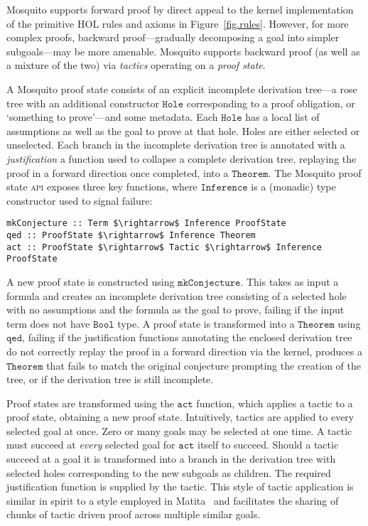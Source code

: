 \documentclass{llncs}
\newcommand{\mosquito}{Mosquito\xspace}
\begin{document}
\mosquito supports forward proof by direct appeal to the kernel implementation of the primitive HOL rules and axioms in Figure~\ref{fig.rules}.
However, for more complex proofs, backward proof---gradually decomposing a goal into simpler subgoals---may be more amenable.
\mosquito supports backward proof (as well as a mixture of the two) via \emph{tactics} operating on a \emph{proof state}.

A \mosquito proof state consists of an explicit incomplete derivation tree---a rose tree with an additional constructor $\mathtt{Hole}$ corresponding to a proof obligation, or `something to prove'---and some metadata.
Each $\mathtt{Hole}$ has a local list of assumptions as well as the goal to prove at that hole.
Holes are either selected or unselected.
Each branch in the incomplete derivation tree is annotated with a \emph{justification} a function used to collapse a complete derivation tree, replaying the proof in a forward direction once completed, into a $\mathtt{Theorem}$.
The \mosquito proof state \textsc{api} exposes three key functions, where $\mathtt{Inference}$ is a (monadic) type constructor used to signal failure:
\begin{lstlisting}
mkConjecture :: Term $\rightarrow$ Inference ProofState
qed :: ProofState $\rightarrow$ Inference Theorem
act :: ProofState $\rightarrow$ Tactic $\rightarrow$ Inference ProofState
\end{lstlisting}

A new proof state is constructed using $\mathtt{mkConjecture}$.
This takes as input a formula and creates an incomplete derivation tree consisting of a selected hole with no assumptions and the formula as the goal to prove, failing if the input term does not have $\mathtt{Bool}$ type.
A proof state is transformed into a $\mathtt{Theorem}$ using $\mathtt{qed}$, failing if the justification functions annotating the enclosed derivation tree do not correctly replay the proof in a forward direction via the kernel, produces a $\mathtt{Theorem}$ that fails to match the original conjecture prompting the creation of the tree, or if the derivation tree is still incomplete.

Proof states are transformed using the $\mathtt{act}$ function, which applies a tactic to a proof state, obtaining a new proof state.
Intuitively, tactics are applied to every selected goal at once.
Zero or many goals may be selected at one time.
A tactic must succeed at \emph{every} selected goal for $\mathtt{act}$ itself to succeed.
Should a tactic succeed at a goal it is transformed into a branch in the derivation tree with selected holes corresponding to the new subgoals as children.
The required justification function is supplied by the tactic.
This style of tactic application is similar in spirit to a style employed in Matita~\cite{asperti:matita:2011} and facilitates the sharing of chunks of tactic driven proof across multiple similar goals.
\end{document}
